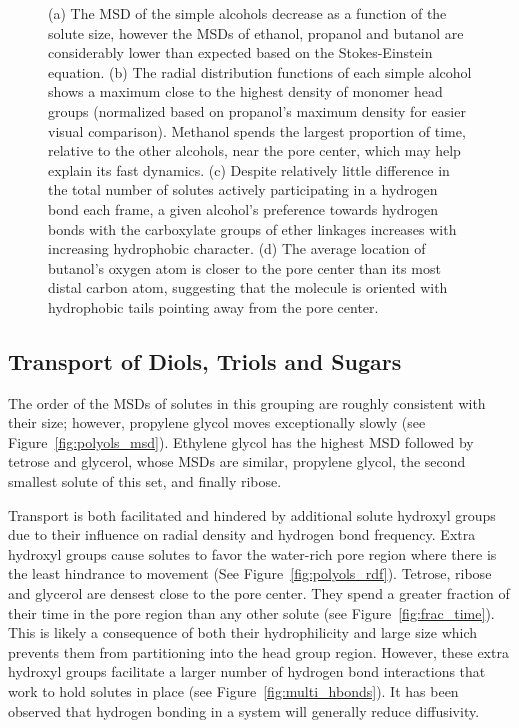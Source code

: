 \documentclass[journal=jpcbfk,manuscript=article]{achemso}
\begin{document}
\begin{figure}[!htb]
  \caption{(a) The MSD of the simple alcohols decrease as a function of the
  solute size, however the MSDs of ethanol, propanol and butanol are considerably
  lower than expected based on the Stokes-Einstein equation. (b) The radial 
  distribution functions of each simple alcohol shows a maximum close to the
  highest density of monomer head groups (normalized based on propanol's maximum
  density for easier visual comparison). Methanol spends the largest proportion 
  of time, relative to the other alcohols, near the pore center, which may help
  explain its fast dynamics. (c) Despite relatively little difference in the 
  total number of solutes actively participating in a hydrogen bond each frame,
  a given alcohol's preference towards hydrogen bonds with the carboxylate groups
  of ether linkages increases with increasing hydrophobic character. (d) The average location of 
  butanol's oxygen atom is closer to the pore center than its most distal carbon
  atom, suggesting that the molecule is oriented with hydrophobic tails pointing
  away from the pore center.}\label{fig:simple_alcohols}
  \end{figure}

  \subsection{Transport of Diols, Triols and Sugars}\label{section:polyols}
  
  The order of the MSDs of solutes in this grouping are roughly consistent with 
  their size; however, propylene glycol moves exceptionally slowly (see 
  Figure~\ref{fig:polyols_msd}). Ethylene glycol has the highest MSD followed
  by tetrose and glycerol, whose MSDs are similar, propylene glycol, the second
  smallest	solute of this set, and finally ribose.
  
  Transport is both facilitated and hindered by additional solute hydroxyl groups
  due to their influence on radial density and hydrogen bond frequency. Extra 
  hydroxyl groups cause solutes to favor the water-rich pore region where there 
  is the least hindrance to movement (See Figure~\ref{fig:polyols_rdf}). Tetrose,
  ribose and glycerol are densest close to the pore center. They spend a greater
  fraction of their time in the pore region than any other solute (see 
  Figure~\ref{fig:frac_time}). This is likely a consequence of both their 
  hydrophilicity and large size which prevents them from partitioning into the 
  head group region. However, these extra hydroxyl groups facilitate a larger 
  number of hydrogen bond interactions that work to hold solutes in place (see 
  Figure~\ref{fig:multi_hbonds}). It has been observed that hydrogen bonding 
  in a system will generally reduce diffusivity.~\cite{srinivas_computer_1999}
  
\end{document}
